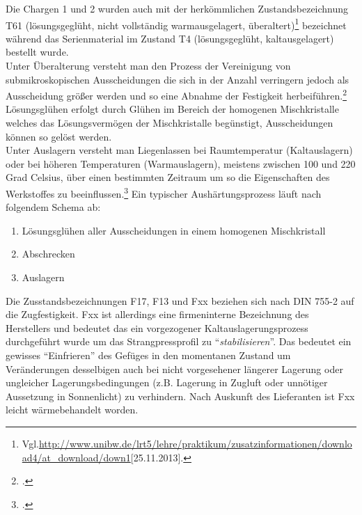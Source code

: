 \documentclass[12pt,a4paper,parskip]{scrartcl}
\begin{document}
 Die Chargen 1 und 2 wurden auch mit der herkömmlichen Zustandsbezeichnung T61 (lösungsgeglüht, nicht vollständig warmausgelagert, überaltert)\footnote{Vgl.\url{http://www.unibw.de/lrt5/lehre/praktikum/zusatzinformationen/download4/at_download/down1}[25.11.2013].} bezeichnet während das Serienmaterial im Zustand T4 (lösungsgeglüht, kaltausgelagert) bestellt wurde. \\
 Unter Überalterung versteht man  den Prozess der Vereinigung von  submikroskopischen Ausscheidungen die sich  in der Anzahl verringern jedoch als Ausscheidung größer werden und so eine Abnahme der Festigkeit herbeiführen.\footcite[Vgl.][52]{wki}\\
  Lösungsglühen erfolgt durch Glühen im Bereich der homogenen Mischkristalle welches das   Lösungsvermögen der Mischkristalle begünstigt, Ausscheidungen können so gelöst werden.\\
   Unter Auslagern versteht man Liegenlassen bei Raumtemperatur (Kaltauslagern) oder bei  höheren Temperaturen (Warmauslagern), meistens zwischen 100 und 220 Grad Celsius, über einen bestimmten Zeitraum um so die Eigenschaften des Werkstoffes zu beeinflussen.\footcite[Vgl.][213]{wk}
Ein typischer Aushärtungsprozess läuft nach folgendem Schema ab:

\begin{enumerate}
 \item Lösungsglühen aller Ausscheidungen in einem homogenen Mischkristall 
 \item Abschrecken
 \item Auslagern 
 \end{enumerate}
 
   
 
 

Die Zusstandsbezeichnungen F17, F13 und Fxx beziehen sich nach DIN 755-2 auf die Zugfestigkeit. Fxx ist allerdings eine firmeninterne Bezeichnung des Herstellers und bedeutet das ein  vorgezogener Kaltauslagerungsprozess durchgeführt wurde um das Strangpressprofil zu "`\emph{stabilisieren}"'. Das bedeutet ein gewisses "`Einfrieren"' des Gefüges in den momentanen Zustand um Veränderungen desselbigen auch bei nicht vorgesehener längerer Lagerung oder ungleicher Lagerungsbedingungen (z.B. Lagerung in Zugluft oder unnötiger Aussetzung in Sonnenlicht) zu verhindern. Nach Auskunft des Lieferanten ist Fxx leicht wärmebehandelt worden.
\end{document}
